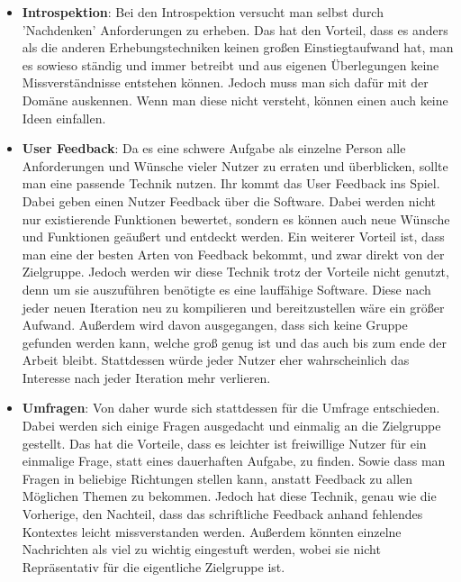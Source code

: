 \begin{itemize}
	\item \textbf{Introspektion}: Bei den Introspektion versucht man selbst durch 'Nachdenken' Anforderungen zu erheben. Das hat den Vorteil, dass es anders als die anderen Erhebungstechniken keinen großen Einstiegtaufwand hat, man es sowieso ständig und immer betreibt und aus eigenen Überlegungen keine Missverständnisse entstehen können. Jedoch muss man sich dafür mit der Domäne auskennen. Wenn man diese nicht versteht, können einen auch keine Ideen einfallen.
	\item \textbf{User Feedback}: Da es eine schwere Aufgabe als einzelne Person alle Anforderungen und Wünsche vieler Nutzer zu erraten und überblicken, sollte man eine passende Technik nutzen. Ihr kommt das User Feedback ins Spiel. Dabei geben einen Nutzer Feedback über die Software. Dabei werden nicht nur existierende Funktionen bewertet, sondern es können auch neue Wünsche und Funktionen geäußert und entdeckt werden. Ein weiterer Vorteil ist, dass man eine der besten Arten von Feedback bekommt, und zwar direkt von der Zielgruppe. \newline Jedoch werden wir diese Technik trotz der Vorteile nicht genutzt, denn um sie auszuführen benötigte es eine lauffähige Software. Diese nach jeder neuen Iteration neu zu kompilieren und bereitzustellen wäre ein größer Aufwand. Außerdem wird davon ausgegangen, dass sich keine Gruppe gefunden werden kann, welche groß genug ist und das auch bis zum ende der Arbeit bleibt. Stattdessen würde jeder Nutzer eher wahrscheinlich das Interesse nach jeder Iteration mehr verlieren.
	\item \textbf{Umfragen}: Von daher wurde sich stattdessen für die Umfrage entschieden. Dabei werden sich einige Fragen ausgedacht und einmalig an die Zielgruppe gestellt. Das hat die Vorteile, dass es leichter ist freiwillige Nutzer für ein einmalige Frage, statt eines dauerhaften Aufgabe, zu finden. Sowie dass man Fragen in beliebige Richtungen stellen kann, anstatt Feedback zu allen Möglichen Themen zu bekommen. Jedoch hat diese Technik, genau wie die Vorherige, den Nachteil, dass das schriftliche Feedback anhand fehlendes Kontextes leicht missverstanden werden. Außerdem könnten einzelne Nachrichten als viel zu wichtig eingestuft werden, wobei sie nicht Repräsentativ für die eigentliche Zielgruppe ist.

\end{itemize}
